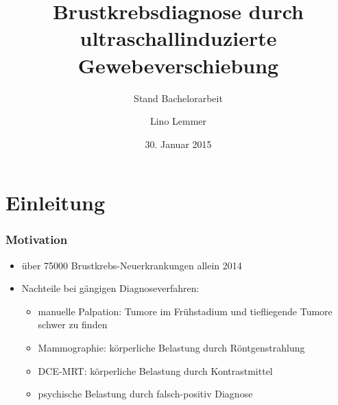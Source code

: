 \documentclass{beamer}
\author{Lino Lemmer}
\title[Brustkrebsdiagnose durch Ultraschall und MRT]{Brustkrebsdiagnose durch ultraschallinduzierte Gewebeverschiebung}
\institute{HISKP - Uni Bonn}
\subtitle{Stand Bachelorarbeit}
\date{30. Januar 2015}
\begin{document}

	\begin{frame}
		\titlepage
	\end{frame}

    \section{Einleitung}


	\begin{frame}
		\frametitle{Motivation}

        \begin{itemize}
            \item
                über \num{75000} Brustkrebs-Neuerkrankungen allein 2014
            \item
                Nachteile bei gängigen Diagnoseverfahren:
                \begin{itemize}
                    \item
                        manuelle Palpation: Tumore im Frühstadium und
                        tiefliegende Tumore schwer zu finden
                    \item
                        Mammographie: körperliche Belastung durch
                        Röntgenstrahlung
                    \item
                        DCE-MRT: körperliche Belastung durch Kontrastmittel
                    \item
                        psychische Belastung durch falsch-positiv Diagnose
                \end{itemize}
        \end{itemize}
	\end{frame}

\end{document}
